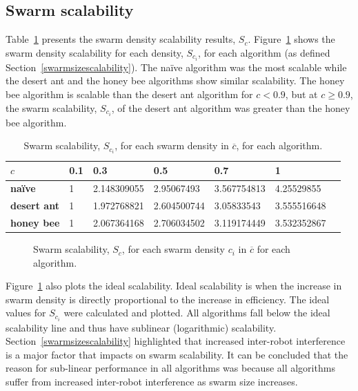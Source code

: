 \subsection{Swarm scalability}
\label{results:swarmscalability}

Table~\ref{table:swarmscalability} presents the swarm density scalability results, $S_c$. Figure~\ref{fig:swarmscalability} shows the swarm density scalability for each density, $S_{c_i}$, for each algorithm (as defined Section~\ref{swarmsizescalability}). The na\"ive algorithm was the most scalable while the desert ant and the honey bee algorithms show similar scalability. The honey bee algorithm is scalable than the desert ant algorithm for $c < 0.9$, but at $c \geq 0.9$, the swarm scalability, $S_{c_i}$, of the desert ant algorithm was greater than the honey bee algorithm.

\begin{table}[!htbp]
\centering
\caption{Swarm scalability, $S_{c_i}$, for each swarm density in $\overline{c}$, for each algorithm.}
\label{table:swarmscalability}
\begin{tabular}{@{}lllllll@{}}
\toprule
\textbf{$c$}            & \textbf{0.1} & \textbf{0.3}         & \textbf{0.5}         & \textbf{0.7}         & \textbf{1}           \\ \midrule
\textbf{na\"ive}    & 1   & 2.148309055 & 2.95067493  & 3.567754813 & 4.25529855  \\
\textbf{desert ant} & 1   & 1.972768821 & 2.604500744 & 3.05833543  & 3.555516648 \\
\textbf{honey bee}  & 1   & 2.067364168 & 2.706034502 & 3.119174449 & 3.532352867 \\ \bottomrule
\end{tabular}
\end{table}

\begin{figure}[!htbp]
\centering
\small
\resizebox{\textwidth}{!}{}
\caption{Swarm scalability, $S_c$, for each swarm density $c_i$ in $\overline{c}$ for each algorithm.}
\label{fig:swarmscalability}
\end{figure}

Figure~\ref{fig:swarmscalability} also plots the ideal scalability. Ideal scalability is when the increase in swarm density is directly proportional to the increase in efficiency. The ideal values for $S_{c_i}$ were calculated and plotted. All algorithms fall below the ideal scalability line and thus have sublinear (logarithmic) scalability. Section~\ref{swarmsizescalability} highlighted that increased inter-robot interference is a major factor that impacts on swarm scalability. It can be concluded that the reason for sub-linear performance in all algorithms was because all algorithms suffer from increased inter-robot interference as swarm size increases.


